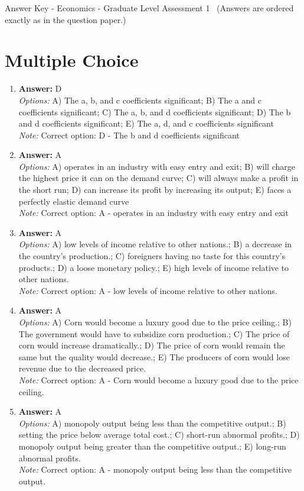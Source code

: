 \documentclass[12pt]{article}
\begin{document}
\begin{center}
Answer Key - Economics - Graduate Level Assessment 1 \
\small (Answers are ordered exactly as in the question paper.)
\end{center}

\section*{Multiple Choice}
\begin{enumerate}[label=\arabic*.]
\item \textbf{Answer:} D
\\ \textit{Options:} A) The a, b, and c coefficients significant; B) The a and c coefficients significant; C) The a, b, and d coefficients significant; D) The b and d coefficients significant; E) The a, d, and c coefficients significant
\\ \textit{Note:} Correct option: D - The b and d coefficients significant
\item \textbf{Answer:} A
\\ \textit{Options:} A) operates in an industry with easy entry and exit; B) will charge the highest price it can on the demand curve; C) will always make a profit in the short run; D) can increase its profit by increasing its output; E) faces a perfectly elastic demand curve
\\ \textit{Note:} Correct option: A - operates in an industry with easy entry and exit
\item \textbf{Answer:} A
\\ \textit{Options:} A) low levels of income relative to other nations.; B) a decrease in the country's production.; C) foreigners having no taste for this country's products.; D) a loose monetary policy.; E) high levels of income relative to other nations.
\\ \textit{Note:} Correct option: A - low levels of income relative to other nations.
\item \textbf{Answer:} A
\\ \textit{Options:} A) Corn would become a luxury good due to the price ceiling.; B) The government would have to subsidize corn production.; C) The price of corn would increase dramatically.; D) The price of corn would remain the same but the quality would decrease.; E) The producers of corn would lose revenue due to the decreased price.
\\ \textit{Note:} Correct option: A - Corn would become a luxury good due to the price ceiling.
\item \textbf{Answer:} A
\\ \textit{Options:} A) monopoly output being less than the competitive output.; B) setting the price below average total cost.; C) short-run abnormal profits.; D) monopoly output being greater than the competitive output.; E) long-run abnormal profits.
\\ \textit{Note:} Correct option: A - monopoly output being less than the competitive output.
\end{enumerate}
\end{document}
